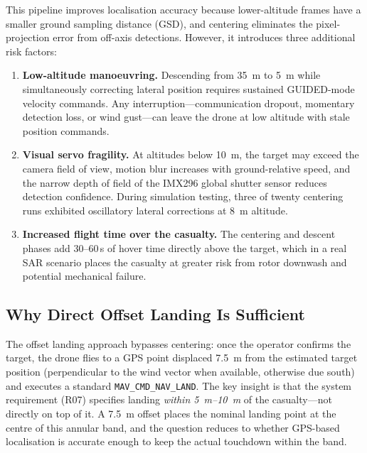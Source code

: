 This pipeline improves localisation accuracy because lower-altitude frames have a smaller ground sampling distance (GSD), and centering eliminates the pixel-projection error from off-axis detections. However, it introduces three additional risk factors:

\begin{enumerate}
    \item \textbf{Low-altitude manoeuvring.} Descending from \SI{35}{\metre} to \SI{5}{\metre} while simultaneously correcting lateral position requires sustained GUIDED-mode velocity commands. Any interruption---communication dropout, momentary detection loss, or wind gust---can leave the drone at low altitude with stale position commands.
    \item \textbf{Visual servo fragility.} At altitudes below \SI{10}{\metre}, the target may exceed the camera field of view, motion blur increases with ground-relative speed, and the narrow depth of field of the IMX296 global shutter sensor reduces detection confidence. During simulation testing, three of twenty centering runs exhibited oscillatory lateral corrections at \SI{8}{\metre} altitude.
    \item \textbf{Increased flight time over the casualty.} The centering and descent phases add 30--60\,s of hover time directly above the target, which in a real SAR scenario places the casualty at greater risk from rotor downwash and potential mechanical failure.
\end{enumerate}

\subsection{Why Direct Offset Landing Is Sufficient}

The offset landing approach bypasses centering: once the operator confirms the target, the drone flies to a GPS point displaced \SI{7.5}{\metre} from the estimated target position (perpendicular to the wind vector when available, otherwise due south) and executes a standard \texttt{MAV\_CMD\_NAV\_LAND}. The key insight is that the system requirement (R07) specifies landing \emph{within \SIrange{5}{10}{\metre}} of the casualty---not directly on top of it. A \SI{7.5}{\metre} offset places the nominal landing point at the centre of this annular band, and the question reduces to whether GPS-based localisation is accurate enough to keep the actual touchdown within the band.

